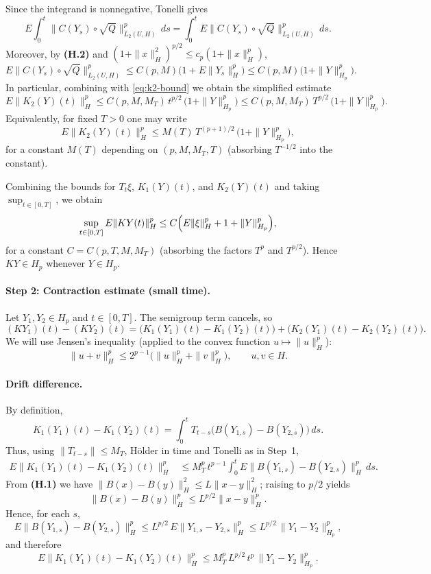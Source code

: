 \documentclass[11pt]{article}
\theoremstyle{definition}
\theoremstyle{remark}
\begin{document}
Since the integrand is nonnegative, Tonelli gives
\[
    E\int_0^t \|C(Y_s)\circ\sqrt{Q}\|_{L_2(U,H)}^p\,ds
    =
    \int_0^t E\|C(Y_s)\circ\sqrt{Q}\|_{L_2(U,H)}^p\,ds.
\]
Moreover, by \textbf{(H.2)} and $(1+\|x\|_H^2)^{p/2}\le c_p(1+\|x\|_H^p)$,
\[
    E\|C(Y_s)\circ\sqrt{Q}\|_{L_2(U,H)}^p
    \le
    C(p,M)\bigl(1+E\|Y_s\|_H^p\bigr)
    \le
    C(p,M)\bigl(1+\|Y\|_{H_p}^p\bigr).
\]
In particular, combining with \eqref{eq:k2-bound} we obtain the simplified estimate
\[
    E\|K_2(Y)(t)\|_H^p
    \le
    C(p,M,M_T)\,t^{p/2}\,\bigl(1+\|Y\|_{H_p}^p\bigr)
    \le
    C(p,M,M_T)\,T^{p/2}\,\bigl(1+\|Y\|_{H_p}^p\bigr).
\]
Equivalently, for fixed $T>0$ one may write
\[
    E\|K_2(Y)(t)\|_H^p
    \le
    M(T)\,T^{(p+1)/2}\,\bigl(1+\|Y\|_{H_p}^p\bigr),
\]
for a constant $M(T)$ depending on $(p,M,M_T,T)$ (absorbing $T^{-1/2}$ into the constant).

Combining the bounds for $T_t\xi$, $K_1(Y)(t)$, and $K_2(Y)(t)$ and taking $\sup_{t\in[0,T]}$, we obtain
\[
    \sup_{t\in[0,T]}E\|KY(t)\|_H^p
    \le
    C\Bigl(E\|\xi\|_H^p + 1 + \|Y\|_{H_p}^p\Bigr),
\]
for a constant $C=C(p,T,M,M_T)$ (absorbing the factors $T^p$ and $T^{p/2}$).
Hence $KY\in H_p$ whenever $Y\in H_p$.

\paragraph{Step 2: Contraction estimate (small time).}
Let $Y_1,Y_2\in H_p$ and $t\in[0,T]$.  The semigroup term cancels, so
\[
    (KY_1)(t)-(KY_2)(t)
    =
    \bigl(K_1(Y_1)(t)-K_1(Y_2)(t)\bigr)
    +
    \bigl(K_2(Y_1)(t)-K_2(Y_2)(t)\bigr).
\]
We will use Jensen's inequality (applied to the convex function $u\mapsto \|u\|_H^p$):
\begin{equation}\label{eq:two-sum-p-ineq}
    \|u+v\|_H^p \le 2^{p-1}\bigl(\|u\|_H^p+\|v\|_H^p\bigr),
    \qquad u,v\in H.
\end{equation}

\paragraph{Drift difference.}
By definition,
\[
    K_1(Y_1)(t)-K_1(Y_2)(t)
    =
    \int_0^t T_{t-s}\bigl(B(Y_{1,s})-B(Y_{2,s})\bigr)\,ds.
\]
Thus, using $\|T_{t-s}\|\le M_T$, H\"older in time and Tonelli as in Step~1,
\[
\begin{aligned}
    E\|K_1(Y_1)(t)-K_1(Y_2)(t)\|_H^p
    &\le
    M_T^p\,t^{p-1}\int_0^t E\|B(Y_{1,s})-B(Y_{2,s})\|_H^p\,ds.
\end{aligned}
\]
From \textbf{(H.1)} we have $\|B(x)-B(y)\|_H^2\le L\|x-y\|_H^2$; raising to $p/2$ yields
\[
    \|B(x)-B(y)\|_H^p\le L^{p/2}\|x-y\|_H^p.
\]
Hence, for each $s$,
\[
    E\|B(Y_{1,s})-B(Y_{2,s})\|_H^p
    \le
    L^{p/2}\,E\|Y_{1,s}-Y_{2,s}\|_H^p
    \le
    L^{p/2}\,\|Y_1-Y_2\|_{H_p}^p,
\]
and therefore
\begin{equation}\label{eq:k1-diff-bound}
    E\|K_1(Y_1)(t)-K_1(Y_2)(t)\|_H^p
    \le
    M_T^p\,L^{p/2}\,t^{p}\,\|Y_1-Y_2\|_{H_p}^p.
\end{equation}
\end{document}
